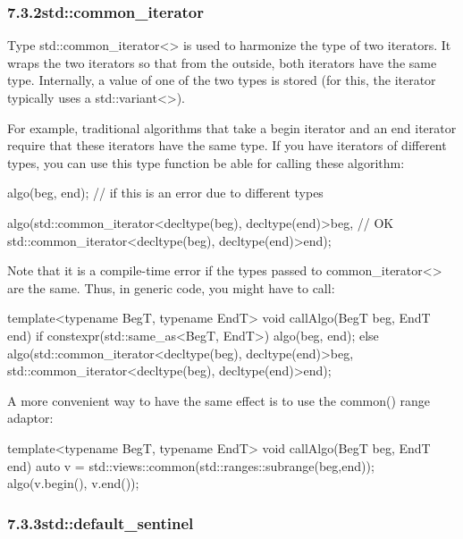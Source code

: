 \subsubsection*{ 7.3.2\hspace{0.2cm}std::common\_iterator}

Type std::common\_iterator<> is used to harmonize the type of two iterators. It wraps the two iterators so that from the outside, both iterators have the same type. Internally, a value of one of the two types is stored (for this, the iterator typically uses a std::variant<>).

For example, traditional algorithms that take a begin iterator and an end iterator require that these iterators have the same type. If you have iterators of different types, you can use this type function be able for calling these algorithm:

\begin{cpp}
algo(beg, end); // if this is an error due to different types

algo(std::common_iterator<decltype(beg), decltype(end)>{beg}, // OK
std::common_iterator<decltype(beg), decltype(end)>{end});
\end{cpp}

Note that it is a compile-time error if the types passed to common\_iterator<> are the same. Thus, in generic code, you might have to call:

\begin{cpp}
template<typename BegT, typename EndT>
void callAlgo(BegT beg, EndT end)
{
	if constexpr(std::same_as<BegT, EndT>) {
		algo(beg, end);
	}
	else {
		algo(std::common_iterator<decltype(beg), decltype(end)>{beg},
		std::common_iterator<decltype(beg), decltype(end)>{end});
	}
}
\end{cpp}

A more convenient way to have the same effect is to use the common() range adaptor:

\begin{cpp}
template<typename BegT, typename EndT>
void callAlgo(BegT beg, EndT end)
{
	auto v = std::views::common(std::ranges::subrange(beg,end));
	algo(v.begin(), v.end());
}
\end{cpp}


\subsubsection*{ 7.3.3\hspace{0.2cm}std::default\_sentinel}

